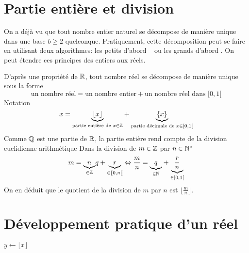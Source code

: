 



\section{Partie entière et division}
On a déjà vu que tout nombre entier naturel se décompose de manière unique dans une base $b\geq2$ quelconque. Pratiquement, cette décomposition peut se faire en utilisant deux algorithmes: \og les petits d'abord \fg~ ou \og les grands d'abord \fg. On peut étendre ces principes des entiers aux réels.

D'après une propriété de $\mathbb{R}$, tout nombre réel se décompose de manière unique sous la forme
\begin{displaymath}
  \text{un nombre réel} = \text{un nombre entier} + \text{un nombre réel dans $[0,1[$}
\end{displaymath}
Notation
\begin{displaymath}
  x = \underset{\text{partie entière de } x\in \mathbb{Z} }{\underbrace{\lfloor x \rfloor}} + \underset{\text{partie décimale de } x\in [0,1[ }{\underbrace{\{ x \}}}
\end{displaymath}
Comme $\mathbb{Q}$ est une partie de $\mathbb{R}$, la partie entière rend compte de la division euclidienne arithmétique\newline
Dans la division de $m\in \mathbb{Z}$ par $n\in \mathbb{N}^*$ 
\begin{displaymath}
  m = \underset{\in \mathbb{Z}}{\underbrace{n}}q + \underset{\in \llbracket 0, n\llbracket}{\underbrace{r}}
  \Leftrightarrow \frac{m}{n} = \underset{\in \mathbb{N}}{\underbrace{q}} + \underset{\in [0,1[}{\underbrace{\frac{r}{n}}} 
\end{displaymath}
On en déduit que le quotient de la division de $m$ par $n$ est $\lfloor \frac{m}{n} \rfloor$.
\section{Développement pratique d'un réel}
\begin{algorithm}
  $y\longleftarrow \lfloor x \rfloor$\;
  \caption{\`A gauche: les petits d'abord.}
  \label{nbbin_1}
\end{algorithm}

